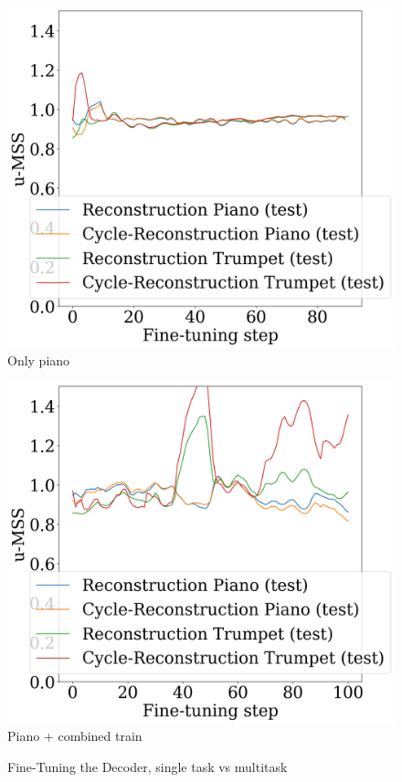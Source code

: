 \begin{figure}
    \begin{minipage}[b]{0.45\textwidth}
        \centering
        \includegraphics[width=\textwidth]{figures/fine-tuning/decoder-only/metrics-over-steps.png}
        \small{\newline Only piano}
    \end{minipage}
    \hfill
    \begin{minipage}[b]{0.45\textwidth}
        \centering
        \includegraphics[width=\textwidth]{figures/fine-tuning/multi-task/metrics.png}
        \small{\newline Piano + combined train}
    \end{minipage}
    \caption{Fine-Tuning the Decoder, single task vs multitask}
    \label{fig:decoder-only}
\end{figure}
